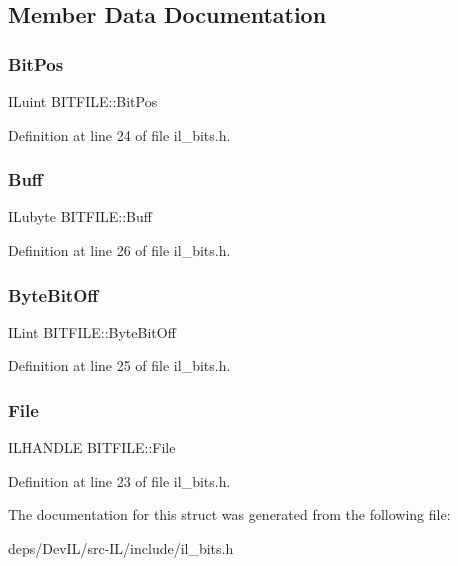 \subsection{Member Data Documentation}
\mbox{\label{structBITFILE_a6cac61ce93cbb4d5d9e1aebf455cd090}} 
\subsubsection{\texorpdfstring{Bit\+Pos}{BitPos}}
{\footnotesize\ttfamily I\+Luint B\+I\+T\+F\+I\+L\+E\+::\+Bit\+Pos}



Definition at line 24 of file il\+\_\+bits.\+h.

\mbox{\label{structBITFILE_a3fe6dadeedb8d444bbdca796f6ec4bf5}} 
\subsubsection{\texorpdfstring{Buff}{Buff}}
{\footnotesize\ttfamily I\+Lubyte B\+I\+T\+F\+I\+L\+E\+::\+Buff}



Definition at line 26 of file il\+\_\+bits.\+h.

\mbox{\label{structBITFILE_abdffeee109e31f84bd96430b474cefc6}} 
\subsubsection{\texorpdfstring{Byte\+Bit\+Off}{ByteBitOff}}
{\footnotesize\ttfamily I\+Lint B\+I\+T\+F\+I\+L\+E\+::\+Byte\+Bit\+Off}



Definition at line 25 of file il\+\_\+bits.\+h.

\mbox{\label{structBITFILE_a1fa6dc6b186d0f56cb13b0f3d4398094}} 
\subsubsection{\texorpdfstring{File}{File}}
{\footnotesize\ttfamily I\+L\+H\+A\+N\+D\+LE B\+I\+T\+F\+I\+L\+E\+::\+File}



Definition at line 23 of file il\+\_\+bits.\+h.



The documentation for this struct was generated from the following file\+:\begin{DoxyCompactItemize}
\item 
deps/\+Dev\+I\+L/src-\/\+I\+L/include/il\+\_\+bits.\+h\end{DoxyCompactItemize}
